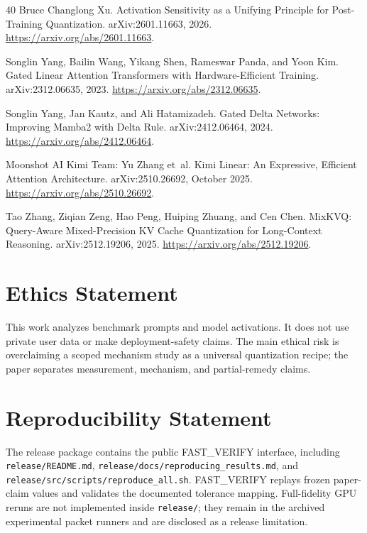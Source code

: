 \documentclass{article}
\begin{document}
\begin{thebibliography}{40}
Bruce Changlong Xu.
\newblock Activation Sensitivity as a Unifying Principle for Post-Training
Quantization.
\newblock arXiv:2601.11663, 2026.
\newblock \url{https://arxiv.org/abs/2601.11663}.

Songlin Yang, Bailin Wang, Yikang Shen, Rameswar Panda, and Yoon Kim.
\newblock Gated Linear Attention Transformers with Hardware-Efficient
Training.
\newblock arXiv:2312.06635, 2023.
\newblock \url{https://arxiv.org/abs/2312.06635}.

Songlin Yang, Jan Kautz, and Ali Hatamizadeh.
\newblock Gated Delta Networks: Improving Mamba2 with Delta Rule.
\newblock arXiv:2412.06464, 2024.
\newblock \url{https://arxiv.org/abs/2412.06464}.

Moonshot AI Kimi Team: Yu Zhang et~al.
\newblock Kimi Linear: An Expressive, Efficient Attention Architecture.
\newblock arXiv:2510.26692, October 2025.
\newblock \url{https://arxiv.org/abs/2510.26692}.

Tao Zhang, Ziqian Zeng, Hao Peng, Huiping Zhuang, and Cen Chen.
\newblock MixKVQ: Query-Aware Mixed-Precision KV Cache Quantization for
Long-Context Reasoning.
\newblock arXiv:2512.19206, 2025.
\newblock \url{https://arxiv.org/abs/2512.19206}.

\end{thebibliography}


\section*{Ethics Statement}
This work analyzes benchmark prompts and model activations. It does not use private user data or make deployment-safety claims. The main ethical risk is overclaiming a scoped mechanism study as a universal quantization recipe; the paper separates measurement, mechanism, and partial-remedy claims.

\section*{Reproducibility Statement}
The release package contains the public FAST\_VERIFY interface, including \texttt{release/README.md}, \texttt{release/docs/reproducing\_results.md}, and \texttt{release/src/scripts/reproduce\_all.sh}. FAST\_VERIFY replays frozen paper-claim values and validates the documented tolerance mapping. Full-fidelity GPU reruns are not implemented inside \texttt{release/}; they remain in the archived experimental packet runners and are disclosed as a release limitation.
\end{document}
